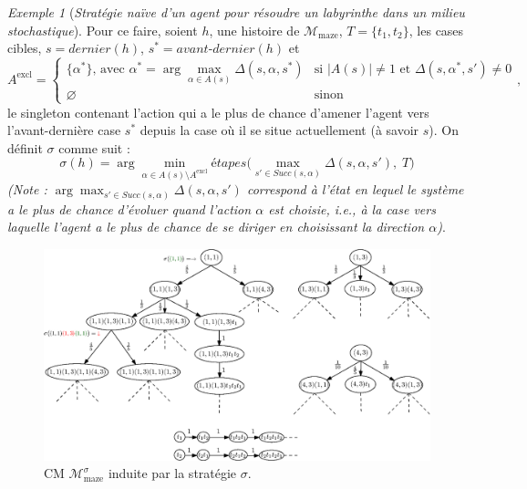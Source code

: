 \documentclass[12pt,a4paper]{report}
\theoremstyle{definition}%
\theoremstyle{remark}
\newtheorem{example}{Exemple}[chapter]
\begin{document}
\begin{example}[\textit{Stratégie naïve d'un agent pour résoudre un labyrinthe dans un milieu stochastique}]
Pour ce faire, soient $h$, une histoire de
$\mathcal{M}_{\text{maze}}$, $T = \{t_1, t_2 \}$, les cases cibles, $s = dernier(h)$, $s^* =
\textit{avant-dernier}(h)$ et
\[A^{\text{excl}} =
\begin{cases}
	\{ \alpha^*\} \text{, avec } \alpha^* = \arg \max_{\alpha \in A(s)} \Delta(s, \alpha, s^*) & \text{si } |A(s)|
		\neq 1 \text{ et } \Delta(s,\alpha^*, s') \neq 0\\
	\varnothing & \text{sinon}
\end{cases},
\] le singleton contenant l'action qui a le plus de chance d'amener l'agent
vers l'avant-dernière case $s^*$ depuis la case où il se situe actuellement (à savoir $s$). On définit $\sigma$ comme suit :
\[
	\sigma(h) = \arg \min_{\alpha \in A(s) \setminus A^{\text{excl}}}
		\textit{étapes}\big(\max_{s' \in Succ(s, \alpha)} \Delta(s, \alpha, s'), \; T
		\big)
\]
\textit{(Note : $\arg \max_{s' \in Succ(s, \alpha)} \Delta(s, \alpha, s')$ correspond à l'état en lequel le système a le plus de chance d'évoluer quand l'action $\alpha$ est choisie, i.e., à la case vers laquelle l'agent a le plus de chance de se
diriger en choisissant la direction $\alpha$)}.\\

	\begin{figure}[H]
		\centering
		\captionsetup{justification=centering}
		\includegraphics[scale=0.65]{figures/inductedMC}
		\caption{CM $\mathcal{M}^\sigma_{\text{maze}}$ induite par la
			stratégie $\sigma$.}
		\label{inducted-MC-strat1}
	\end{figure}
\end{example}
\end{document}
